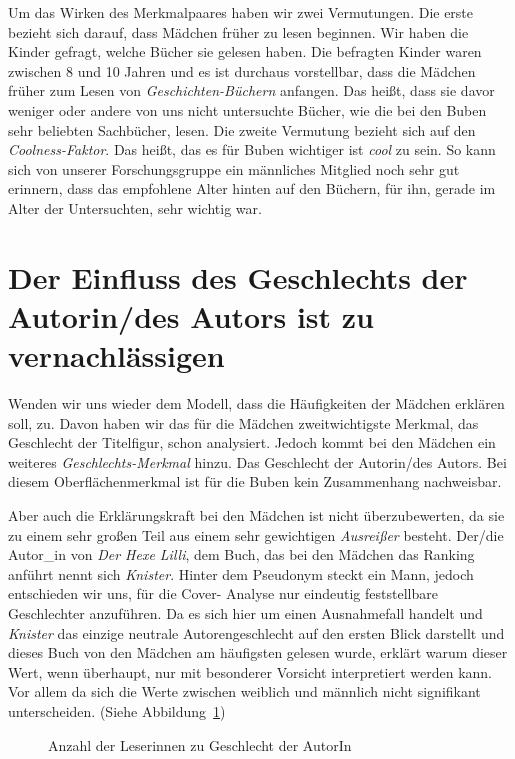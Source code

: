 Um das Wirken des Merkmalpaares haben wir zwei Vermutungen. Die erste
bezieht sich darauf, dass Mädchen früher zu lesen beginnen. Wir haben
die Kinder gefragt, welche Bücher sie gelesen haben. Die befragten
Kinder waren zwischen 8 und 10 Jahren und es ist durchaus vorstellbar,
dass die Mädchen früher zum Lesen von \emph{Geschichten-Büchern}
anfangen. Das heißt, dass sie davor weniger oder andere von uns nicht
untersuchte Bücher, wie die bei den Buben sehr beliebten Sachbücher,
lesen. Die zweite Vermutung bezieht sich auf den \emph{Coolness-Faktor}.
Das heißt, das es für Buben wichtiger ist \emph{cool} zu sein. So kann
sich von unserer Forschungsgruppe ein männliches Mitglied noch sehr gut
erinnern, dass das empfohlene Alter hinten auf den Büchern, für ihn,
gerade im Alter der Untersuchten, sehr wichtig war.

\section{Der Einfluss des Geschlechts der Autorin/des Autors ist zu
vernachlässigen}

Wenden wir uns wieder dem Modell, dass die Häufigkeiten der Mädchen
erklären soll, zu. Davon haben wir das für die Mädchen zweitwichtigste
Merkmal, das Geschlecht der Titelfigur, schon analysiert. Jedoch kommt
bei den Mädchen ein weiteres \emph{Geschlechts-Merkmal} hinzu. Das
Geschlecht der Autorin/des Autors. Bei diesem Oberflächenmerkmal ist für
die Buben kein Zusammenhang nachweisbar.

Aber auch die Erklärungskraft bei den Mädchen ist nicht überzubewerten,
da sie zu einem sehr großen Teil aus einem sehr gewichtigen
\emph{Ausreißer} besteht. Der/die Autor\_in von \emph{Der Hexe Lilli},
dem Buch, das bei den Mädchen das Ranking anführt nennt sich
\emph{Knister}. Hinter dem Pseudonym steckt ein Mann, jedoch entschieden
wir uns, für die Cover- Analyse nur eindeutig feststellbare Geschlechter
anzuführen. Da es sich hier um einen Ausnahmefall handelt und
\emph{Knister} das einzige neutrale Autorengeschlecht auf den ersten
Blick darstellt und dieses Buch von den Mädchen am häufigsten gelesen
wurde, erklärt warum dieser Wert, wenn überhaupt, nur mit besonderer
Vorsicht interpretiert werden kann. Vor allem da sich die Werte zwischen
weiblich und männlich nicht signifikant unterscheiden. (Siehe
Abbildung~\ref{maedchen-geschlecht})

\begin{figure}
\center
  \caption[Leserinnen--Geschlecht]{Anzahl der Leserinnen zu Geschlecht der AutorIn}
  \label{maedchen-geschlecht}


\end{figure}

